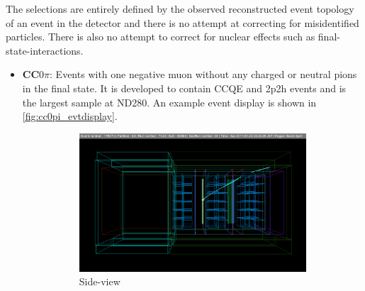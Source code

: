 The selections are entirely defined by the observed reconstructed event topology of an event in the detector and there is no attempt at correcting for misidentified particles. There is also no attempt to correct for nuclear effects such as final-state-interactions.
\begin{itemize}
\item \textbf{CC$0\pi$}: Events with one negative muon without any charged or neutral pions in the final state. It is developed to contain CCQE and 2p2h events and is the largest sample at ND280. An example event display is shown in \autoref{fig:cc0pi_evtdisplay}. 
\begin{figure}[htbp]
	\begin{subfigure}[t]{0.49\textwidth}
		\includegraphics[width=\textwidth, trim={1cm 2.8cm 0 1cm}, clip]{figures/numu/evtdisplay/CC0pi_7423_34_179070_perX0Z_all}
		\caption{Side-view}
	\end{subfigure}
	\begin{subfigure}[t]{0.49\textwidth}

\end{subfigure}
\end{figure}
\end{itemize}
